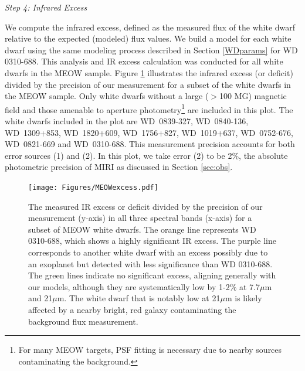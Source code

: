\documentclass[twocolumn]{aastex631}
\begin{document}
\begin{center}
    \vspace{-1mm}
    {\it Step 4: Infrared Excess}
    \vspace{-2mm}
\end{center}
We compute the infrared excess, defined as the measured flux of the white dwarf relative to the expected (modeled) flux values. We build a model for each white dwarf using the same modeling process described in Section \ref{WDparams} for WD 0310-688. This analysis and IR excess calculation was conducted for all white dwarfs in the MEOW sample. Figure \ref{MEOWexcess} illustrates the infrared excess (or deficit) divided by the precision of our measurement for a subset of the white dwarfs in the MEOW sample. Only white dwarfs without a large ($>$100 MG) magnetic field and those amenable to aperture photometry\footnote{For many MEOW targets, PSF fitting is necessary due to nearby sources contaminating the background.} are included in this plot. {The white dwarfs included in the plot are WD~0839-327, WD~0840-136, WD~1309+853, WD~1820+609, WD~1756+827, WD~1019+637, WD~0752-676, WD~0821-669 and WD~0310-688.} This measurement precision accounts for both error sources (1) and (2). In this plot, we take error (2) to be 2\%, the absolute photometric precision of MIRI as discussed in Section \ref{sec:obs}. 

\begin{figure}
\begin{center}
\vspace{-2mm}
\leavevmode
\begin{minipage}[c]{0.49\textwidth}
\texttt{[image: Figures/MEOWexcess.pdf]}
\end{minipage}\hfill
\begin{minipage}[c]{0.47\textwidth}
\caption{The measured IR excess or deficit divided by the precision of our measurement (y-axis) in all three spectral bands (x-axis) for a subset of MEOW white dwarfs. The orange line represents WD 0310-688, which shows a highly significant IR excess. The purple line corresponds to another white dwarf with an excess possibly due to an exoplanet but detected with less significance than WD 0310-688. The green lines indicate no significant excess, aligning generally with our models, although they are systematically low by 1-2\% at 7.7$\mu$m and 21$\mu$m. The white dwarf that is notably low at 21$\mu$m is likely affected by a nearby bright, red galaxy contaminating the background flux measurement.}
\label{MEOWexcess}
\end{minipage}
\end{center}
\end{figure}
\end{document}
